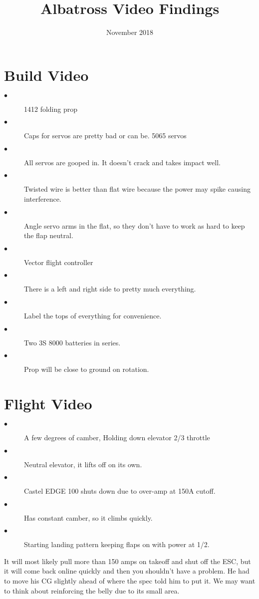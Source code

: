 \documentclass{article}
\title{Albatross Video Findings}
\date{November 2018}
\begin{document}
\maketitle

\section*{Build Video}
\begin{description}
  \item[$\bullet$] 1412 folding prop
  \item[$\bullet$] Caps for servos are pretty bad or can be. 5065 servos
  \item[$\bullet$] All servos are gooped in. It doesn’t crack and takes impact well.
  \item[$\bullet$] Twisted wire is better than flat wire because the power may spike causing interference.
  \item[$\bullet$] Angle servo arms in the flat, so they don’t have to work as hard to keep the flap neutral.
  \item[$\bullet$] Vector flight controller
  \item[$\bullet$] There is a left and right side to pretty much everything.
  \item[$\bullet$] Label the tops of everything for convenience.
  \item[$\bullet$] Two 3S 8000 batteries in series.
  \item[$\bullet$] Prop will be close to ground on rotation.
\end{description}

\section*{Flight Video}
\begin{description}
  \item[$\bullet$] A few degrees of camber, Holding down elevator 2/3 throttle
  \item[$\bullet$] Neutral elevator, it lifts off on its own.
  \item[$\bullet$] Castel EDGE 100 shuts down due to over-amp at 150A cutoff.
  \item[$\bullet$] Has constant camber, so it climbs quickly.
  \item[$\bullet$] Starting landing pattern keeping flaps on with power at 1/2.
\end{description}
It will most likely pull more than 150 amps on takeoff and shut off the ESC, but it will come back online quickly and then you shouldn't have a problem. He had to move his CG slightly ahead of where the spec told him to put it. We may want to think about reinforcing the belly due to its small area.
\end{document}
